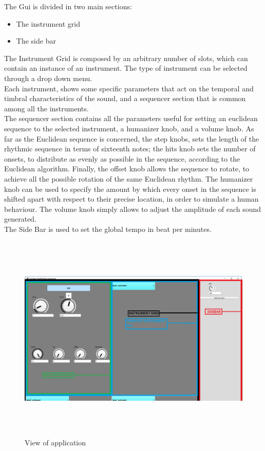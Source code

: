 \documentclass[main.tex]{subfiles}
\begin{document}
The Gui is divided in two main sections:
\begin{itemize}[noitemsep]
\item The instrument grid
\item The side bar
\end{itemize}
The Instrument Grid is composed by an arbitrary number of slots, which can contain an instance of an instrument. The type of instrument can be selected through a drop down menu.\\
[2mm]
Each instrument, shows some specific parameters that act on the temporal and timbral characteristics of the sound, and a sequencer section that is common among all the instruments.\\
[2mm]
The sequencer section contains all the parameters useful for setting an euclidean sequence to the selected instrument, a humanizer knob, and a volume knob. 
As far as the Euclidean sequence is concerned, the step knobs, sets the length of the rhythmic sequence in terms of sixteenth notes; the hits knob sets the number of onsets, to distribute as evenly as possible in the sequence, according to the Euclidean algorithm. Finally, the offset knob allows the sequence to rotate, to achieve all the possible rotation of the same Euclidean rhythm.
The humanizer knob can be used to specify the amount by which every onset in the sequence is shifted apart with respect to their precise location, in order to simulate a human behaviour.
The volume knob simply allows to adjust the amplitude of each sound generated.\\
[2mm]
The Side Bar is used to set the global tempo in beat per minutes.\\
[2mm]
\begin{figure}[htbp]
\centering
\includegraphics[height=10cm, width=15cm, keepaspectratio]{images/gui.png}
\caption{View of application}
\end{figure}\\
\end{document}
